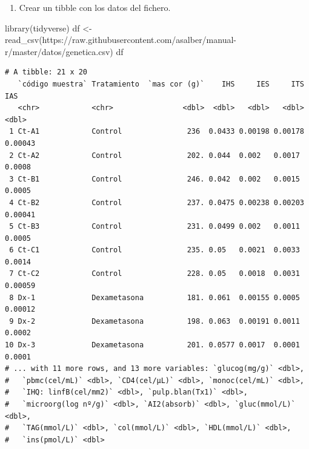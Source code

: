 \documentclass[
  a4paper,
]{scrreport}
\newenvironment{Shaded}{\begin{snugshade}}{\end{snugshade}}
\newcommand{\FunctionTok}[1]{\textcolor[rgb]{0.28,0.35,0.67}{#1}}
\newcommand{\NormalTok}[1]{\textcolor[rgb]{0.00,0.23,0.31}{#1}}
\newcommand{\OtherTok}[1]{\textcolor[rgb]{0.00,0.23,0.31}{#1}}
\newcommand{\StringTok}[1]{\textcolor[rgb]{0.13,0.47,0.30}{#1}}
\providecommand{\tightlist}{%
  \setlength{\itemsep}{0pt}\setlength{\parskip}{0pt}}\usepackage{longtable,booktabs,array}
\theoremstyle{definition}
\theoremstyle{definition}
\theoremstyle{remark}
\begin{document}
\begin{enumerate}
\def\labelenumi{\alph{enumi}.}
\tightlist
\item
  Crear un tibble con los datos del fichero.
\end{enumerate}

\begin{tcolorbox}[enhanced jigsaw, left=2mm, colframe=quarto-callout-note-color-frame, breakable, colback=white, title=\textcolor{quarto-callout-note-color}{\faInfo}\hspace{0.5em}{Solución}, toprule=.15mm, arc=.35mm, leftrule=.75mm, colbacktitle=quarto-callout-note-color!10!white, opacityback=0, coltitle=black, opacitybacktitle=0.6, rightrule=.15mm, bottomrule=.15mm, bottomtitle=1mm, toptitle=1mm, titlerule=0mm]

\begin{Shaded}
\begin{Highlighting}[]
\FunctionTok{library}\NormalTok{(tidyverse)}
\NormalTok{df }\OtherTok{\textless{}{-}} \FunctionTok{read\_csv}\NormalTok{(}\StringTok{\textquotesingle{}https://raw.githubusercontent.com/asalber/manual{-}r/master/datos/genetica.csv\textquotesingle{}}\NormalTok{)}
\NormalTok{df}
\end{Highlighting}
\end{Shaded}

\begin{verbatim}
# A tibble: 21 x 20
   `código muestra` Tratamiento  `mas cor (g)`    IHS     IES     ITS     IAS
   <chr>            <chr>                <dbl>  <dbl>   <dbl>   <dbl>   <dbl>
 1 Ct-A1            Control               236  0.0433 0.00198 0.00178 0.00043
 2 Ct-A2            Control               202. 0.044  0.002   0.0017  0.0008 
 3 Ct-B1            Control               246. 0.042  0.002   0.0015  0.0005 
 4 Ct-B2            Control               237. 0.0475 0.00238 0.00203 0.00041
 5 Ct-B3            Control               231. 0.0499 0.002   0.0011  0.0005 
 6 Ct-C1            Control               235. 0.05   0.0021  0.0033  0.0014 
 7 Ct-C2            Control               228. 0.05   0.0018  0.0031  0.00059
 8 Dx-1             Dexametasona          181. 0.061  0.00155 0.0005  0.00012
 9 Dx-2             Dexametasona          198. 0.063  0.00191 0.0011  0.0002 
10 Dx-3             Dexametasona          201. 0.0577 0.0017  0.0001  0.0001 
# ... with 11 more rows, and 13 more variables: `glucog(mg/g)` <dbl>,
#   `pbmc(cel/mL)` <dbl>, `CD4(cel/µL)` <dbl>, `monoc(cel/mL)` <dbl>,
#   `IHQ: linfB(cel/mm2)` <dbl>, `pulp.blan(Tx1)` <dbl>,
#   `microorg(log nº/g)` <dbl>, `AI2(absorb)` <dbl>, `gluc(mmol/L)` <dbl>,
#   `TAG(mmol/L)` <dbl>, `col(mmol/L)` <dbl>, `HDL(mmol/L)` <dbl>,
#   `ins(pmol/L)` <dbl>
\end{verbatim}

\end{tcolorbox}
\end{document}
